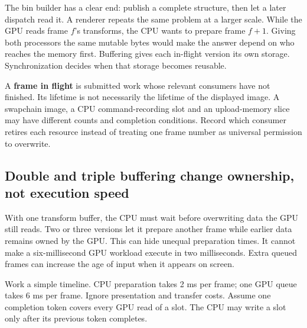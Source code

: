 The bin builder has a clear end: publish a complete structure, then let a later dispatch read it. A renderer repeats the same problem at a larger scale. While the GPU reads frame \(f\)'s transforms, the CPU wants to prepare frame \(f+1\). Giving both processors the same mutable bytes would make the answer depend on who reaches the memory first. Buffering gives each in-flight version its own storage. Synchronization decides when that storage becomes reusable.

A \textbf{frame in flight} is submitted work whose relevant consumers have not finished. Its lifetime is not necessarily the lifetime of the displayed image. A swapchain image, a CPU command-recording slot and an upload-memory slice may have different counts and completion conditions. Record which consumer retires each resource instead of treating one frame number as universal permission to overwrite.

\subsection{Double and triple buffering change ownership, not execution speed}\label{03-visual-computing-i-ch016-double-and-triple-buffering-change-ownership-not-execution-speed}

With one transform buffer, the CPU must wait before overwriting data the GPU still reads. Two or three versions let it prepare another frame while earlier data remains owned by the GPU. This can hide unequal preparation times. It cannot make a six-millisecond GPU workload execute in two milliseconds. Extra queued frames can increase the age of input when it appears on screen.

Work a simple timeline. CPU preparation takes 2 ms per frame; one GPU queue takes 6 ms per frame. Ignore presentation and transfer costs. Assume one completion token covers every GPU read of a slot. The CPU may write a slot only after its previous token completes.

